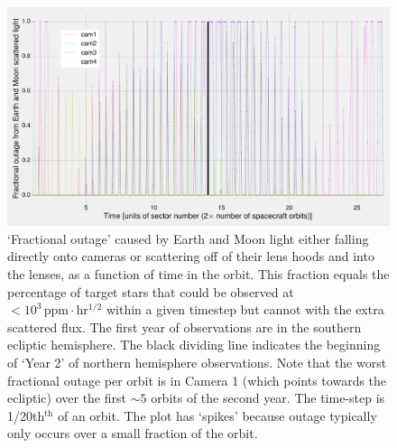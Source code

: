 \begin{figure}[!tb]
	\centering
	\includegraphics[angle=90,width=\textwidth]{figures/outage_earth_moon_primary.pdf}
	\caption{`Fractional outage' caused by Earth and Moon light either falling directly onto \tesss cameras or scattering off of their lens hoods and into the lenses, as a function of time in the orbit.
	This fraction equals the percentage of target stars that could be observed at $<10^3\,\mathrm{ppm\cdot hr^{1/2}}$ within a given timestep but cannot with the extra scattered flux.
	The first year of observations are in the southern ecliptic hemisphere. The black dividing line indicates the beginning of `Year 2' of northern hemisphere observations. Note that the worst fractional outage per orbit is in Camera 1 (which points towards the ecliptic) over the first $\sim\!5$ orbits of the second year.
	The time-step is 1/20th$^\mathrm{th}$ of an orbit.
	The plot has `spikes' because outage typically only occurs over a small fraction of the orbit.}
	\label{fig:earth_moon_primary}
\end{figure}
